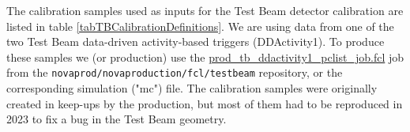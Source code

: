 \documentclass[12pt,a4paper]{article}
\begin{document}


The calibration samples used as inputs for the Test Beam detector calibration are listed in table \ref{tabTBCalibrationDefinitions}. We are using data from one of the two Test Beam data-driven activity-based triggers (DDActivity1). To produce these samples we (or production) use the 
\href{https://github.com/novaexperiment/novaprod/blob/main/novaproduction/fcl/testbeam/prod\_tb\_ddactivity1\_pclist\_job.fcl}{prod\_tb\_ddactivity1\_pclist\_job.fcl} job from the \texttt{novaprod/novaproduction/fcl/testbeam} repository, or the corresponding simulation ("mc") file. The calibration samples were originally created in keep-ups by the production, but most of them had to be reproduced in 2023 to fix a bug in the Test Beam geometry.

\end{document}
